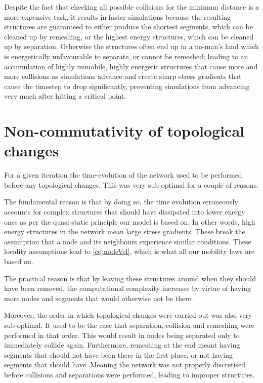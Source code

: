 Despite the fact that checking all possible collisions for the minimum distance is a more expensive task, it results in faster simulations because the resulting structures are guaranteed to either produce the shortest segments, which can be cleaned up by remeshing, or the highest energy structures, which can be cleaned up by separation. Otherwise the structures often end up in a no-man's land which is energetically unfavourable to separate, or cannot be remeshed; leading to an accumulation of highly immobile, highly energetic structures that cause more and more collisions as simulations advance and create sharp stress gradients that cause the timestep to drop significantly, preventing simulations from advancing very much after hitting a critical point.

\section{Non-commutativity of topological changes}\label{s:nonCommutativity}
For a given iteration the time-evolution of the network used to be performed before any topological changes. This was very sub-optimal for a couple of reasons.

The fundamental reason is that by doing so, the time evolution erroneously accounts for complex structures that should have dissipated into lower energy ones as per the quasi-static principle our model is based on. In other words, high energy structures in the network mean large stress gradients. These break the assumption that a node and its neighbours experience similar conditions. These locality assumptions lead to \cref{eq:nodeVel}, which is what all our mobility laws are based on.

The practical reason is that by leaving these structures around when they should have been removed, the computational complexity increases by virtue of having more nodes and segments that would otherwise not be there.

Moreover, the order in which topological changes were carried out was also very sub-optimal. It used to be the case that separation, collision and remeshing were performed in that order. This would result in nodes being separated only to immediately collide again. Furthermore, remeshing at the end meant having segments that should not have been there in the first place, or not having segments that should have. Meaning the network was not properly discretised before collisions and separations were performed, leading to improper structures.

